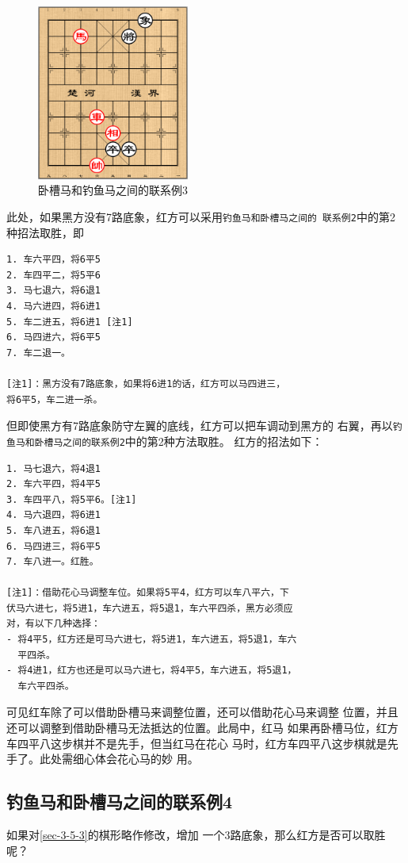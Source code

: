 \documentclass[a5paper,twoside]{book}
\begin{document}
\begin{figure}[H]
\centering
\includegraphics[width=5cm]{pic/卧槽马和钓鱼马之间的联系-车位调整.png}
\caption{卧槽马和钓鱼马之间的联系例3}
\end{figure}

此处，如果黑方没有7路底象，红方可以采用\texttt{钓鱼马和卧槽马之间的
联系例2}中的第2种招法取胜，即

\begin{verbatim}
1. 车六平四，将6平5
2. 车四平二，将5平6
3. 马七退六，将6退1
4. 马六进四，将6进1
5. 车二进五，将6进1 [注1]
6. 马四进六，将6平5 
7. 车二退一。

[注1]：黑方没有7路底象，如果将6进1的话，红方可以马四进三，
将6平5，车二进一杀。
\end{verbatim}

但即使黑方有7路底象防守左翼的底线，红方可以把车调动到黑方的
右翼，再以\texttt{钓鱼马和卧槽马之间的联系例2}中的第2种方法取胜。
红方的招法如下：

\begin{verbatim}
1. 马七退六，将4退1
2. 车六平四，将4平5
3. 车四平八，将5平6。[注1]
4. 马六退四，将6进1
5. 车八进五，将6退1
6. 马四进三，将6平5
7. 车八进一。红胜。

[注1]：借助花心马调整车位。如果将5平4，红方可以车八平六，下
伏马六进七，将5进1，车六进五，将5退1，车六平四杀，黑方必须应
对，有以下几种选择：
- 将4平5，红方还是可马六进七，将5进1，车六进五，将5退1，车六
  平四杀。
- 将4进1，红方也还是可以马六进七，将4平5，车六进五，将5退1，
  车六平四杀。
\end{verbatim}

可见红车除了可以借助卧槽马来调整位置，还可以借助花心马来调整
位置，并且还可以调整到借助卧槽马无法抵达的位置。此局中，红马
如果再卧槽马位，红方车四平八这步棋并不是先手，但当红马在花心
马时，红方车四平八这步棋就是先手了。此处需细心体会花心马的妙
用。

\subsection{钓鱼马和卧槽马之间的联系例4}
\label{sec-3-5-4}
如果对\ref{sec-3-5-3}的棋形略作修改，增加
一个3路底象，那么红方是否可以取胜呢？
\end{document}
